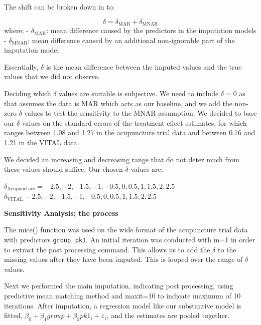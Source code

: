 \documentclass{article}
\begin{document}
The shift can be broken down in to:

\[\delta = \delta_\mathrm{MAR} + \delta_\mathrm{MNAR}\] where; -
\(\delta_\mathrm{MAR}\): mean difference caused by the predictors in the
imputation models - \(\delta_\mathrm{MNAR}\): mean difference caused by
an additional non-ignorable part of the imputation model

Essentially, \(\delta\) is the mean difference between the imputed
values and the true values that we did not observe.

Deciding which \(\delta\) values are suitable is subjective. We need to
include \(\delta=0\) as that assumes the data is MAR which acts as our
baseline, and we add the non-zero \(\delta\) values to test the
sensitivity to the MNAR assumption. We decided to base our \(\delta\)
values on the standard errors of the treatment effect estimates, for
which ranges between 1.08 and 1.27 in the acupuncture trial data and
between 0.76 and 1.21 in the VITAL data.

We decided an increasing and decreasing range that do not deter much
from these values should suffice. Our chosen \(\delta\) values are;

\(\delta_\mathrm{Acupuncture} = -2.5,-2,-1.5,-1,-0.5,0,0.5,1,1.5,2,2.5\)
\(\delta_\mathrm{VITAL} -2.5,-2,-1.5,-1,-0.5,0,0.5,1,1.5,2,2.5\)

\textbf{Sensitivity Analysis; the process}

The mice() function was used on the wide format of the acupuncture trial
data with predictors \texttt{group}, \texttt{pk1}. An initial iteration
was conducted with m=1 in order to extract the post processing command.
This allows us to add the \(\delta\) to the missing values after they
have been imputed. This is looped over the range of \(\delta\) values.

Next we performed the main imputation, indicating post processing, using
predictive mean matching method and maxit=10 to indicate maximum of 10
iterations. After imputation, a regression model like our substantive
model is fitted, \(\beta_0 + \beta_1group+\beta_2pk1_i+\varepsilon_i\),
and the estimates are pooled together.

\newpage
\end{document}
